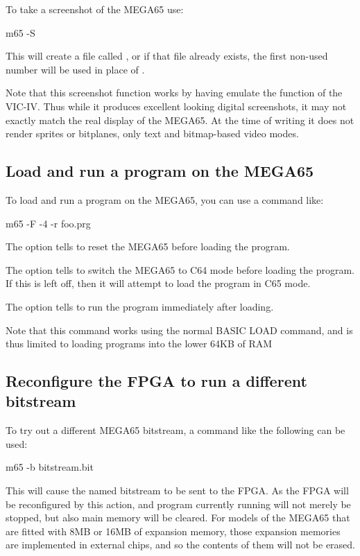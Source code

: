 To take a screenshot of the MEGA65 use:

\begin{screenoutput}
m65 -S
\end{screenoutput}

This will create a file called ,
or if that file already exists, the first non-used number will be used
in place of .

Note that this screenshot function works by having  emulate the
function of the VIC-IV. Thus while it produces excellent looking
digital screenshots, it may not exactly match the real display of the
MEGA65.  At the time of writing it does not render sprites or
bitplanes, only text and bitmap-based video modes.

\subsection{Load and run a program on the MEGA65}

To load and run a program on the MEGA65, you can use a command like:

\begin{screenoutput}
m65 -F -4 -r foo.prg
\end{screenoutput}

The  option tells  to reset the MEGA65
before loading the program.

The  option tells  to switch the MEGA65
to C64 mode before loading the program. If this is left off, then it
will attempt to load the program in C65 mode.

The  option tells  to run the program
immediately after loading.

Note that this command works using the normal BASIC LOAD command, and
is thus limited to loading programs into the lower 64KB of RAM

\subsection{Reconfigure the FPGA to run a different bitstream}

To try out a different MEGA65 bitstream, a command like the following can be
used:

\begin{screenoutput}
m65 -b bitstream.bit
\end{screenoutput}

This will cause the named bitstream to be sent to the FPGA.  As the
FPGA will be reconfigured by this action, and program currently
running will not merely be stopped, but also main memory will be
cleared. For models of the MEGA65 that are fitted with 8MB or 16MB of
expansion memory, those expansion memories are implemented in external
chips, and so the contents of them will not be erased.

